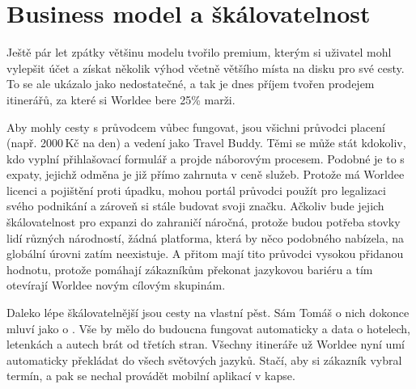 \section{Business model a škálovatelnost}

Ještě pár let zpátky většinu modelu tvořilo premium, kterým si uživatel mohl vylepšit účet a získat několik výhod včetně většího místa na disku pro své cesty. To se ale ukázalo jako nedostatečné, a tak je dnes příjem tvořen prodejem itinerářů, za které si Worldee bere 25\% marži.

Aby mohly cesty s průvodcem vůbec fungovat, jsou všichni průvodci placení (např. 2000\,Kč na den) a vedení jako Travel Buddy. Těmi se může stát kdokoliv, kdo vyplní přihlašovací formulář a projde náborovým procesem. Podobné je to s expaty, jejichž odměna je již přímo zahrnuta v ceně služeb. Protože má Worldee licenci a pojištění proti úpadku, mohou portál průvodci použít pro legalizaci svého podnikání a zároveň si stále budovat svoji značku. Ačkoliv bude jejich škálovatelnost pro expanzi do zahraničí náročná, protože budou potřeba stovky lidí různých národností, žádná platforma, která by něco podobného nabízela, na globální úrovni zatím neexistuje. A přitom mají tito průvodci vysokou přidanou hodnotu, protože pomáhají zákazníkům překonat jazykovou bariéru a tím otevírají Worldee novým cílovým skupinám.

Daleko lépe škálovatelnější jsou cesty na vlastní pěst. Sám Tomáš o nich dokonce mluví jako o . Vše by mělo do budoucna fungovat automaticky a data o hotelech, letenkách a autech brát od třetích stran. Všechny itineráře už Worldee nyní umí automaticky překládat do všech světových jazyků. Stačí, aby si zákazník vybral termín, a pak se nechal provádět mobilní aplikací v kapse.

